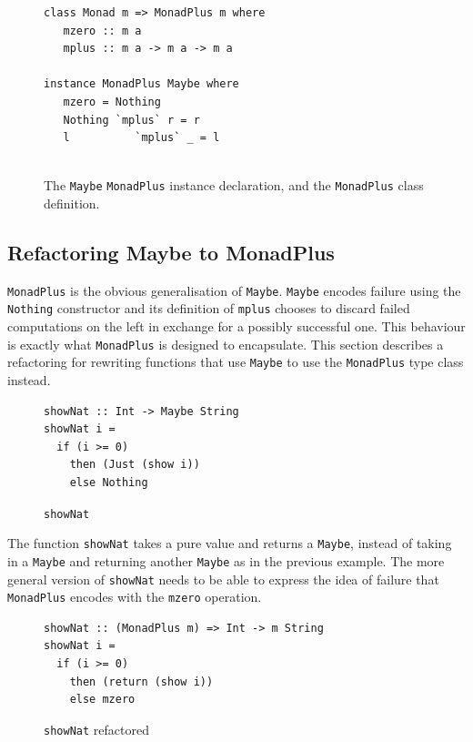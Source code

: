 \begin{figure}[t]
\begin{lstlisting}                 
class Monad m => MonadPlus m where
   mzero :: m a
   mplus :: m a -> m a -> m a

instance MonadPlus Maybe where
   mzero = Nothing
   Nothing `mplus` r = r
   l          `mplus` _ = l
                 
\end{lstlisting}
\caption{The \texttt{Maybe} \texttt{MonadPlus} instance declaration, and the \texttt{MonadPlus} class definition.}
\label{maybeMonadPlusDef}
\end{figure}



\subsection{Refactoring Maybe to MonadPlus} 
\label{maybeMonadPlus}
\texttt{MonadPlus} is the obvious generalisation of \texttt{Maybe}. \texttt{Maybe} encodes failure using the \texttt{Nothing} constructor and its definition of \texttt{mplus} chooses to discard failed computations on the left in exchange for a possibly successful one. This behaviour is exactly what \texttt{MonadPlus} is designed to encapsulate. This section describes a refactoring for rewriting functions that use \texttt{Maybe} to use the \texttt{MonadPlus} type class instead.

\begin{figure}[t]
\begin{lstlisting}
showNat :: Int -> Maybe String
showNat i =
  if (i >= 0)
    then (Just (show i))
    else Nothing
\end{lstlisting}
\caption{\texttt{showNat}}
\label{mmp2}
\end{figure}

The function \texttt{showNat} takes a pure value and returns a \texttt{Maybe}, instead of taking in a \texttt{Maybe} and returning another \texttt{Maybe} as in the previous example. The more general version of \texttt{showNat} needs to be able to express the idea of failure that \texttt{MonadPlus} encodes with the \texttt{mzero} operation. 

\begin{figure}[t]
\begin{lstlisting}
showNat :: (MonadPlus m) => Int -> m String
showNat i =
  if (i >= 0)
    then (return (show i))
    else mzero
\end{lstlisting}
\caption{\texttt{showNat} refactored}
\label{mmp2Ref}
\end{figure} 
 
